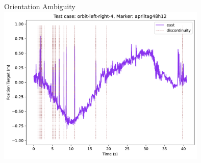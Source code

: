 \documentclass[aspectratio=169]{beamer}
\newif\ifpause
\newcommand{\mypause}{\ifpause \pause \fi}
\begin{document}
\begin{frame}{Orientation Ambiguity}
	\centering
	\vspace{\fill}
	\includegraphics[width=10cm]{./images/orbit-left-right-4_apriltag48h12_position-target}
	\vspace{\fill}
\end{frame}
\end{document}
